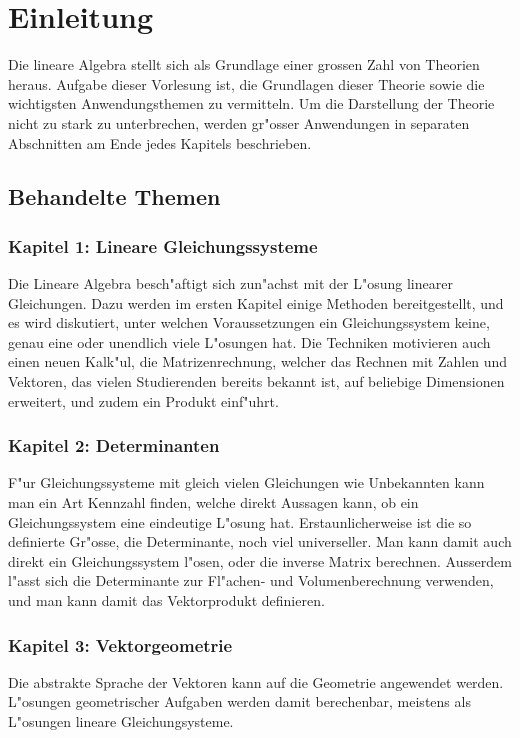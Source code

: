 %
%
%
\chapter*{Einleitung}

Die lineare Algebra stellt sich als Grundlage einer grossen
Zahl von Theorien heraus.
Aufgabe dieser Vorlesung ist, die
Grundlagen dieser Theorie sowie die wichtigsten Anwendungsthemen
zu vermitteln.
Um die Darstellung der Theorie nicht zu stark zu unterbrechen,
werden gr"osser Anwendungen in separaten Abschnitten am Ende
jedes Kapitels beschrieben.

\section*{Behandelte Themen}
\subsection*{Kapitel 1: Lineare Gleichungssysteme}
Die Lineare Algebra besch"aftigt sich zun"achst mit der L"osung linearer
Gleichungen.
Dazu werden im ersten Kapitel einige Methoden bereitgestellt,
und es wird diskutiert, unter welchen Voraussetzungen ein
Gleichungssystem keine, genau eine oder unendlich viele
L"osungen hat.
Die Techniken motivieren auch einen neuen Kalk"ul, die Matrizenrechnung,
welcher das Rechnen mit Zahlen und Vektoren, das vielen
Studierenden bereits bekannt ist, auf beliebige Dimensionen erweitert,
und zudem ein Produkt einf"uhrt.

\subsection*{Kapitel 2: Determinanten}
F"ur Gleichungssysteme mit gleich vielen Gleichungen wie Unbekannten
kann man ein Art Kennzahl finden, welche direkt Aussagen kann,
ob ein Gleichungssystem eine eindeutige L"osung hat.
Erstaunlicherweise ist die so definierte Gr"osse, die Determinante,
noch viel universeller.
Man kann damit auch direkt ein Gleichungssystem l"osen, oder
die inverse Matrix berechnen.
Ausserdem l"asst sich die Determinante zur Fl"achen- und Volumenberechnung
verwenden, und man kann damit das Vektorprodukt definieren.

\subsection*{Kapitel 3: Vektorgeometrie}
Die abstrakte Sprache der Vektoren kann auf die Geometrie angewendet
werden.
L"osungen geometrischer Aufgaben werden damit berechenbar,
meistens als L"osungen lineare Gleichungsysteme.

